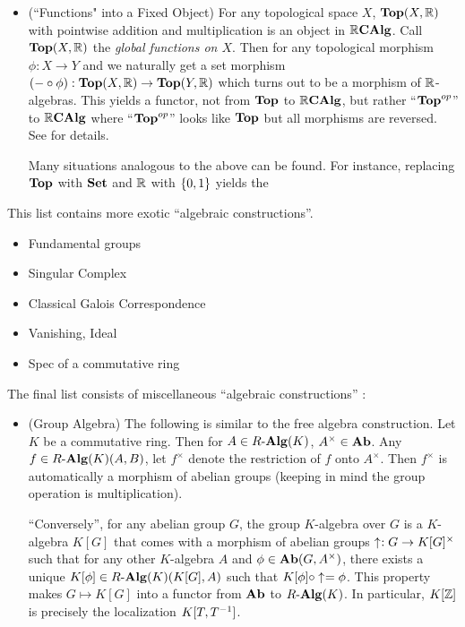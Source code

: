 \begin{eg}
\begin{itemize}
    \item (``Functions" into a Fixed Object)
    For any topological space $X$, 
    $\mathbf{Top}(X,\mathbb{R})$ with pointwise addition and multiplication is
    an object in $\mathbb{R}\mathbf{CAlg}$.
    Call $\mathbf{Top}(X,\mathbb{R})$ the \emph{global functions on $X$}.
    Then for any topological morphism $\phi : X \to Y$ and 
    we naturally get a set morphism 
    $(- \circ \phi) : \mathbf{Top}(X,\mathbb{R}) \to \mathbf{Top}(Y,\mathbb{R})$ which turns out to be 
    a morphism of $\mathbb{R}$-algebras. 
    This yields a functor, not from $\mathbf{Top}$ to $\mathbb{R}\mathbf{CAlg}$, but rather 
    ``$\mathbf{Top}^{op}$'' to $\mathbb{R}\mathbf{CAlg}$  where 
    ``$\mathbf{Top}^{op}$'' looks like $\mathbf{Top}$ but all morphisms are reversed. 
    See  for details. 

    Many situations analogous to the above can be found. 
    For instance, replacing $\mathbf{Top}$ with $\mathbf{Set}$ and $\mathbb{R}$ with $\left\{0,1\right\}$
    yields the 
    
  \end{itemize}

  This list contains more exotic ``algebraic constructions''.
  \begin{itemize}
    \item Fundamental groups
    \item Singular Complex
    \item Classical Galois Correspondence
    \item Vanishing, Ideal
    \item Spec of a commutative ring
  \end{itemize}

  The final list consists of miscellaneous ``algebraic constructions'' :
  \begin{itemize}
    \item (Group Algebra)
    The following is similar to the free algebra construction. 
    Let $K$ be a commutative ring.
    Then for $A \in R\text{-}\mathbf{Alg}(K)$, $A^\times \in \mathbf{Ab}$.
    Any $f \in R\text{-}\mathbf{Alg}(K)(A,B)$, 
    let $f^\times$ denote the restriction of $f$ onto $A^\times$.
    Then $f^\times$ is automatically a morphism of abelian groups
    (keeping in mind the group operation is multiplication).
    
    ``Conversely'',
    for any abelian group $G$,
    the group $K$-algebra over $G$ is a $K$-algebra $K[G]$ that comes with
    a morphism of abelian groups $\uparrow_{}^{} : G \to K[G]^\times$ such that
    for any other $K$-algebra $A$ and $\phi \in \mathbf{Ab}(G,A^\times)$,
    there exists a unique $K[\phi] \in R\text{-}\mathbf{Alg}(K)(K[G],A)$ such that 
    $K[\phi] \circ \uparrow_{}^{} = \phi$. 
    This property makes $G \mapsto K[G]$ into a functor from 
    $\mathbf{Ab}$ to $R\text{-}\mathbf{Alg}(K)$.
    In particular, $K[\mathbb{Z}]$ is precisely the localization $K[T,T^{-1}]$. 


\end{itemize}
\end{eg}
